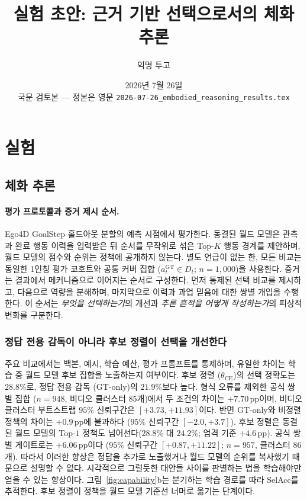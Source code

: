 \documentclass[letterpaper]{article}
\title{실험 초안: 근거 기반 선택으로서의 체화 추론}
\author{익명 투고}
\affil{익명 소속}
\date{2026년 7월 26일 \\ \small 국문 검토본 --- 정본은 영문
  \texttt{2026-07-26\_embodied\_reasoning\_results.tex}}
\newcommand{\obs}[1]{\textcolor{measuredblue}{#1}}
\newcommand{\pp}{\,\mathrm{pp}}
\begin{document}
\setlength{\emergencystretch}{1em}
\maketitle

\section{실험}
\subsection{체화 추론}
\label{sec:er-capability}

\paragraph{평가 프로토콜과 증거 제시 순서.}
Ego4D GoalStep 홀드아웃 분할의 예측 시점에서 평가한다.
동결된 월드 모델은 관측과 완료 행동 이력을 입력받은 뒤 순서를 무작위로 섞은
Top-$K$ 행동 경계를 제안하며, 월드 모델의 점수와 순위는 정책에 공개하지 않는다.
별도 언급이 없는 한, 모든 비교는 동일한 1인칭 평가 코호트와 공통 커버 집합
($a_t^{\mathrm{GT}}\!\in D_t$; \obs{$n{=}1{,}000$})을 사용한다.
증거는 결과에서 메커니즘으로 이어지는 순서로 구성한다. 먼저 통제된 선택 비교를
제시하고, 다음으로 역량을 분해하며, 마지막으로 이력과 과업 믿음에 대한 쌍별
개입을 수행한다. 이 순서는 \emph{무엇을 선택하는가}의 개선과
\emph{추론 흔적을 어떻게 작성하는가}의 피상적 변화를 구분한다.

\subsubsection{정답 전용 감독이 아니라 후보 정렬이 선택을 개선한다}
\label{sec:er-selection}

주요 비교에서는 백본, 예시, 학습 예산, 평가 프롬프트를 통제하며, 유일한 차이는
학습 중 월드 모델 후보 집합을 노출하는지 여부이다. 후보 정렬
($\theta_{\mathrm{CE}}$)의 선택 정확도는 \obs{$28.8\%$}로, 정답 전용 감독
(GT-only)의 \obs{$21.9\%$}보다 높다. 형식 오류를 제외한 공식 쌍별 집합
(\obs{$n{=}948$}, 비디오 클러스터 85개)에서 두 조건의 차이는
\obs{$+7.70\pp$}이며, 비디오 클러스터 부트스트랩
\obs{$95\%$ 신뢰구간은 $[+3.73,+11.93]$}이다.
반면 GT-only와 비정렬 정책의 차이는 \obs{$+0.9\pp$}에 불과하다
(\obs{$95\%$ 신뢰구간 $[-2.0,+3.7]$}). 후보 정렬은 동결된 월드 모델의
Top-\obs{$1$} 정책도 넘어선다(\obs{$28.8\%$} 대 \obs{$24.2\%$}; 엄격 기준
\obs{$+4.6\pp$}). 공식 쌍별 게이트로는 \obs{$+6.06\pp$}이다
(\obs{$95\%$ 신뢰구간 $[+0.87,+11.22]$}; \obs{$n{=}957$}, 클러스터 86개).
따라서 이러한 향상은 정답을 추가로 노출했거나 월드 모델의
순위를 복사했기 때문으로 설명할 수 없다. 시각적으로 그럴듯한 대안들 사이를
판별하는 법을 학습해야만 얻을 수 있는 향상이다.
그림~\ref{fig:capability}b는 분기하는 학습 경로를 따라 SelAcc를 추적한다.
후보 정렬이 정책을 월드 모델 기준선 너머로 옮기는 단계이다.
\end{document}
